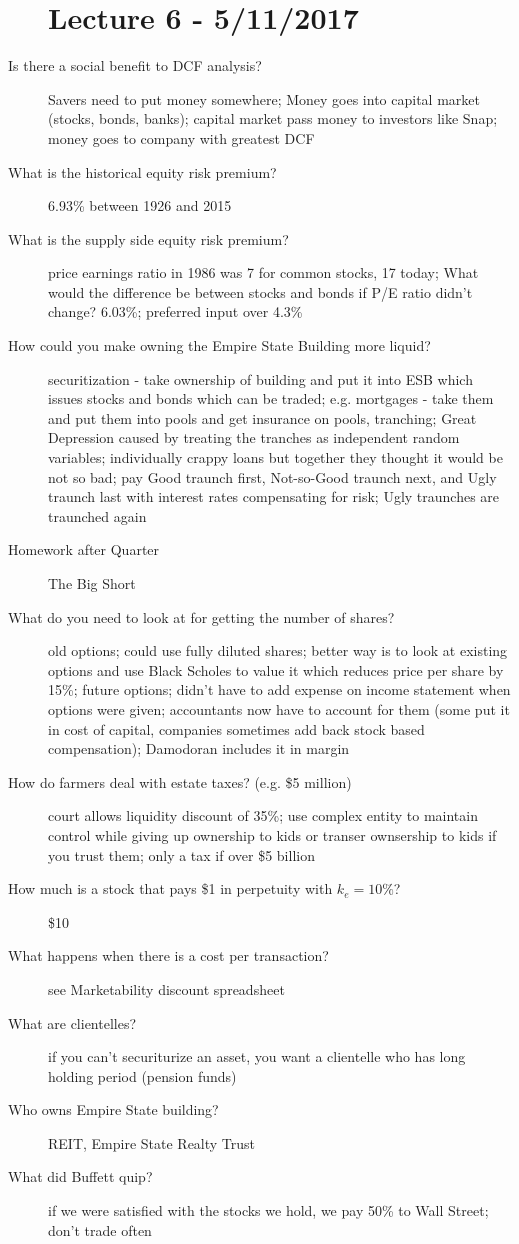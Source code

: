\documentclass[11pt]{article}
\begin{document}
\begin{description}
\section{Lecture 6 - 5/11/2017}
\item[Is there a social benefit to DCF analysis?]
  Savers need to put money somewhere;
  Money goes into capital market (stocks, bonds, banks);
  capital market pass money to investors like Snap;
  money goes to company with greatest DCF
\item[What is the historical equity risk premium?]
  6.93\% between 1926 and 2015
\item[What is the supply side equity risk premium?]
  price earnings ratio in 1986 was 7 for common stocks, 17 today;
  What would the difference be between stocks and bonds if P/E ratio didn't change? 6.03\%;
  preferred input over 4.3\%
\item[How could you make owning the Empire State Building more liquid?]
  securitization - take ownership of building and put it into ESB which issues stocks and bonds which can be traded;
  e.g. mortgages - take them and put them into pools and get insurance on pools, tranching;
  Great Depression caused by treating the tranches as independent random variables;
  individually crappy loans but together they thought it would be not so bad;
  pay Good traunch first, Not-so-Good traunch next, and Ugly traunch last with interest rates compensating for risk;
  Ugly traunches are traunched again
\item[Homework after Quarter]
  The Big Short
\item[What do you need to look at for getting the number of shares?]
  old options;
  could use fully diluted shares;
  better way is to look at existing options and use Black Scholes to value it which reduces price per share by 15\%;
  future options;
  didn't have to add expense on income statement when options were given;
  accountants now have to account for them (some put it in cost of capital, companies sometimes add back stock based compensation);
  Damodoran includes it in margin
\item[How do farmers deal with estate taxes? (e.g. \$5 million)]
  court allows liquidity discount of 35\%;
  use complex entity to maintain control while giving up ownership to kids or transer ownsership to kids if you trust them;
  only a tax if over \$5 billion
\item[How much is a stock that pays \$1 in perpetuity with $k_e = 10\%$?]
  \$10
\item[What happens when there is a cost per transaction?]
  see Marketability discount spreadsheet
\item[What are clientelles?]
  if you can't securiturize an asset, you want a clientelle who has long holding period (pension funds)
\item[Who owns Empire State building?]
  REIT, Empire State Realty Trust
\item[What did Buffett quip?]
  if we were satisfied with the stocks we hold, we pay 50\% to Wall Street;
  don't trade often
\end{description}
\end{document}
